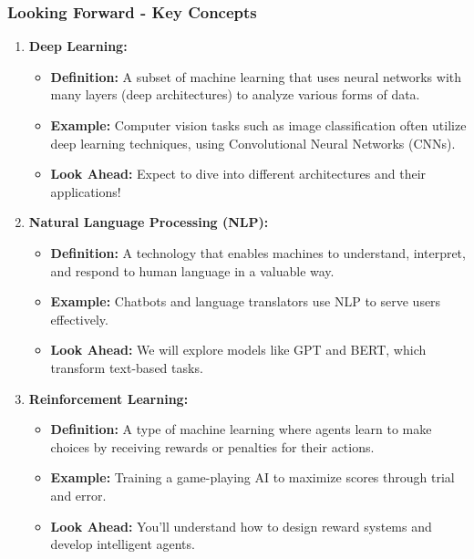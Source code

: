 \documentclass[aspectratio=169]{beamer}
\begin{document}
\begin{frame}[fragile]
  \frametitle{Looking Forward - Key Concepts}
  \begin{enumerate}
    \item \textbf{Deep Learning:}
      \begin{itemize}
        \item \textbf{Definition:} A subset of machine learning that uses neural networks with many layers (deep architectures) to analyze various forms of data.
        \item \textbf{Example:} Computer vision tasks such as image classification often utilize deep learning techniques, using Convolutional Neural Networks (CNNs).
        \item \textbf{Look Ahead:} Expect to dive into different architectures and their applications!
      \end{itemize}
    
    \item \textbf{Natural Language Processing (NLP):}
      \begin{itemize}
        \item \textbf{Definition:} A technology that enables machines to understand, interpret, and respond to human language in a valuable way.
        \item \textbf{Example:} Chatbots and language translators use NLP to serve users effectively.
        \item \textbf{Look Ahead:} We will explore models like GPT and BERT, which transform text-based tasks.
      \end{itemize}
    
    \item \textbf{Reinforcement Learning:}
      \begin{itemize}
        \item \textbf{Definition:} A type of machine learning where agents learn to make choices by receiving rewards or penalties for their actions.
        \item \textbf{Example:} Training a game-playing AI to maximize scores through trial and error.
        \item \textbf{Look Ahead:} You’ll understand how to design reward systems and develop intelligent agents.
      \end{itemize}
  \end{enumerate}
\end{frame}
\end{document}
